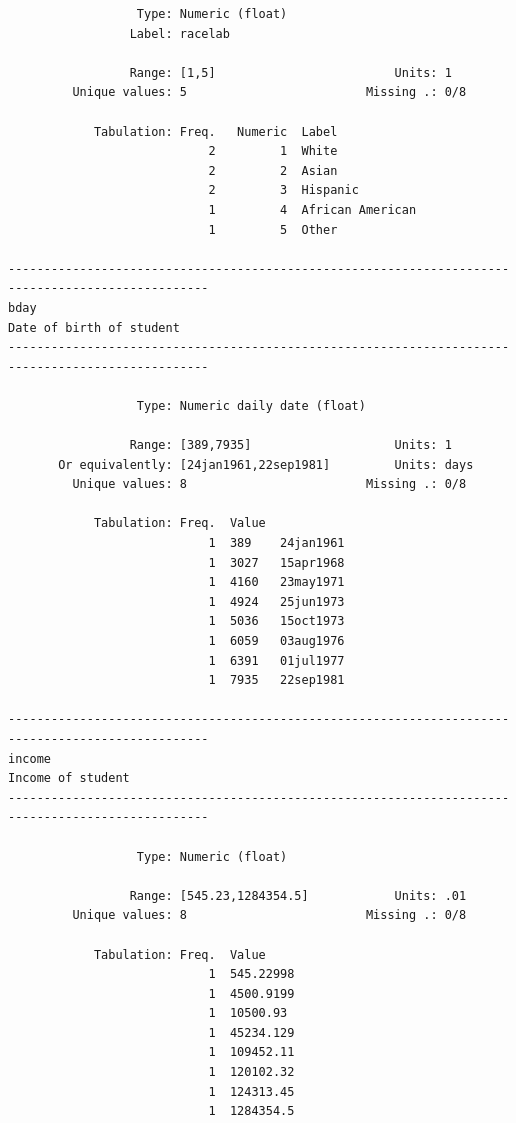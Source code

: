 \documentclass[
]{book}
\begin{document}
\begin{verbatim}
                  Type: Numeric (float)
                 Label: racelab

                 Range: [1,5]                         Units: 1
         Unique values: 5                         Missing .: 0/8

            Tabulation: Freq.   Numeric  Label
                            2         1  White
                            2         2  Asian
                            2         3  Hispanic
                            1         4  African American
                            1         5  Other

--------------------------------------------------------------------------------------------------
bday                                                                      Date of birth of student
--------------------------------------------------------------------------------------------------

                  Type: Numeric daily date (float)

                 Range: [389,7935]                    Units: 1
       Or equivalently: [24jan1961,22sep1981]         Units: days
         Unique values: 8                         Missing .: 0/8

            Tabulation: Freq.  Value
                            1  389    24jan1961
                            1  3027   15apr1968
                            1  4160   23may1971
                            1  4924   25jun1973
                            1  5036   15oct1973
                            1  6059   03aug1976
                            1  6391   01jul1977
                            1  7935   22sep1981

--------------------------------------------------------------------------------------------------
income                                                                           Income of student
--------------------------------------------------------------------------------------------------

                  Type: Numeric (float)

                 Range: [545.23,1284354.5]            Units: .01
         Unique values: 8                         Missing .: 0/8

            Tabulation: Freq.  Value
                            1  545.22998
                            1  4500.9199
                            1  10500.93
                            1  45234.129
                            1  109452.11
                            1  120102.32
                            1  124313.45
                            1  1284354.5


\end{verbatim}
\end{document}
